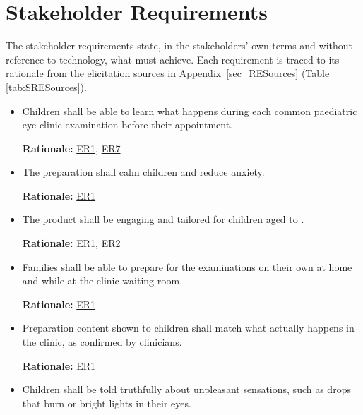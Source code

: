 \documentclass[12pt]{article}
\newcounter{srnum} %
\newcommand{\constref}[1]{%
    \hyperref[const:#1]{\texttt{\detokenize{#1}}}%
}
\begin{document}
\section{Stakeholder Requirements} \label{sec_StakeholderReqs}

The stakeholder requirements state, in the stakeholders' own terms and without reference
to technology, what \progname{} must achieve. Each requirement is traced to its rationale from the elicitation sources in
Appendix~\ref{sec_RESources} (Table \ref{tab:SRESources}).
\noindent \begin{itemize}

\item[\textbf{STR\refstepcounter{srnum}\thesrnum:} \label{SR_Label1}] Children shall be able to learn what happens during 
each common paediatric eye clinic examination before their appointment.

\textbf{Rationale:} \hyperref[ER1]{ER1}, \hyperref[ER7]{ER7}

\item[\textbf{STR\refstepcounter{srnum}\thesrnum:} \label{SR_Label2}] The preparation shall calm children and reduce anxiety.

\textbf{Rationale:} \hyperref[ER1]{ER1}

\item[\textbf{STR\refstepcounter{srnum}\thesrnum:} \label{SR_Label3}] The product shall be engaging and tailored for children
aged \constref{MIN_AGE} to \constref{MAX_AGE}.

\textbf{Rationale:} \hyperref[ER1]{ER1}, \hyperref[ER2]{ER2}

\item[\textbf{STR\refstepcounter{srnum}\thesrnum:} \label{SR_Label4}] Families shall be able to prepare for the examinations 
on their own at home and while at the clinic waiting room.

\textbf{Rationale:} \hyperref[ER1]{ER1}

\item[\textbf{STR\refstepcounter{srnum}\thesrnum:} \label{SR_Label5}] Preparation content shown to children shall match what 
actually happens in the clinic, as confirmed by clinicians.

\textbf{Rationale:} \hyperref[ER1]{ER1}

\item[\textbf{STR\refstepcounter{srnum}\thesrnum:} \label{SR_Label6}] Children shall be told truthfully about unpleasant 
sensations, such as drops that burn or bright lights in their eyes.


\end{itemize}
\end{document}
